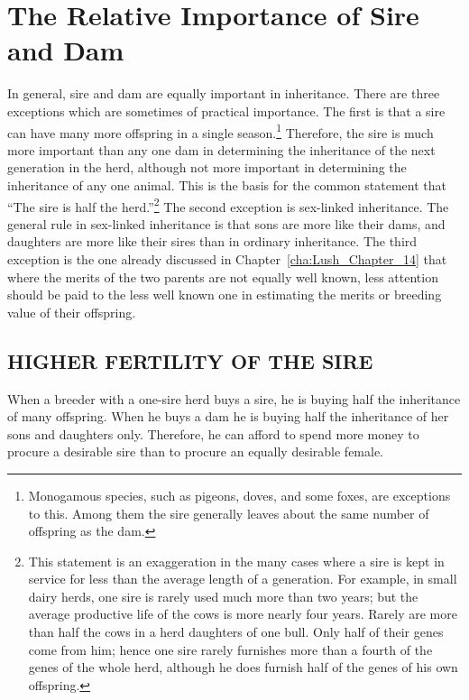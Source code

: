 \chapter{The Relative Importance of Sire and Dam}
\label{cha:Lush_Chapter_29}

In general, sire and dam are equally important in inheritance.
There are three exceptions which are sometimes of practical importance.
The first is that a sire can have many more offspring in a single
season.\footnote{Monogamous species, such as pigeons, doves, and some
foxes, are exceptions to this. Among them the sire generally leaves about
the same number of offspring as the dam.} Therefore, the sire is much more
important than any one dam in determining the inheritance of the next
generation in the herd, although not more important in determining the
inheritance of any one animal. This is the basis for the common statement
that ``The sire is half the herd.''\footnote{This statement is an
exaggeration in the many cases where a sire is kept in service for less
than the average length of a generation. For example, in small dairy
herds, one sire is rarely used much more than two years; but the average
productive life of the cows is more nearly four years. Rarely are more
than half the cows in a herd daughters of one bull. Only half of their
genes come from him; hence one sire rarely furnishes more than a fourth
of the genes of the whole herd, although he does furnish half of the genes
of his own offspring.} The second exception is sex-linked inheritance. The
general rule in sex-linked inheritance is that sons are more like their
dams, and daughters are more like their sires than in ordinary inheritance.
The third exception is the one already discussed in
Chapter~\ref{cha:Lush_Chapter_14} that where the merits of the two parents
are not equally well known, less attention should be paid to the less well
known one in estimating the merits or breeding value of their offspring.

\section*{HIGHER FERTILITY OF THE SIRE}

When a breeder with a one-sire herd buys a sire, he is buying half
the inheritance of many offspring. When he buys a dam he is buying
half the inheritance of her sons and daughters only. Therefore, he can
afford to spend more money to procure a desirable sire than to procure
an equally desirable female.

